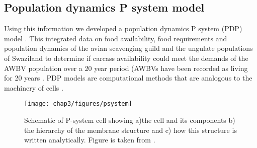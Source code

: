 \subsection{Population dynamics P system model}

Using this information we developed a population dynamics P system (PDP) model \citep{colomer2013population}. This integrated data on food availability, food requirements and population dynamics of the avian scavenging guild and the ungulate populations of Swaziland to determine if carcass availability could meet the demands of the AWBV population over a 20 year period (AWBVs have been recorded as living for 20 years \citep{de2009database}. PDP models are computational methods that are analogous to the machinery of cells \citep{colomer2013population}. 

\begin{figure}[H] %
	  \centering
	  \texttt{[image: chap3/figures/psystem]}
	    \caption[Schematic of P-system cell] %
	    {Schematic of P-system cell showing a)the cell and its components b) the hierarchy of the membrane structure and c) how this structure is written analytically. Figure is taken from \cite{colomer2013population}.}%
	  \label{fig:psystem}
	\end{figure}
	


